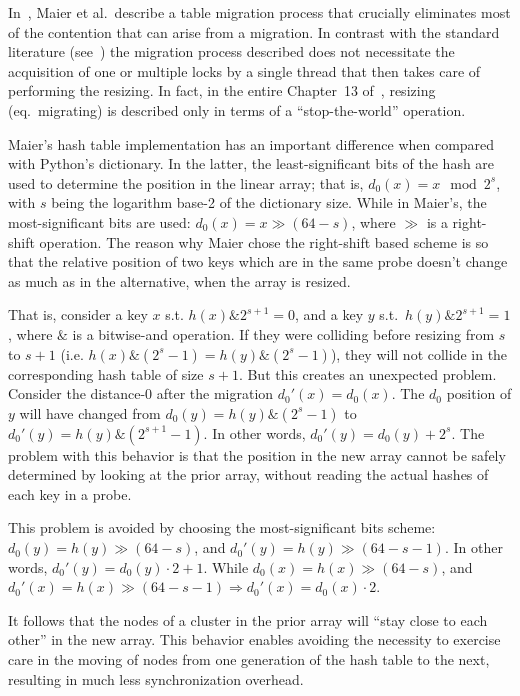 In~\cite{maier}, Maier et al.\ describe a table migration process that crucially eliminates most of the contention that can arise from a migration.
In contrast with the standard literature (see~\cite[Figure~13.30]{art-mp}) the migration process described does not necessitate the acquisition of one or multiple locks by a single thread that then takes care of performing the resizing.
In fact, in the entire Chapter~13 of~\cite{art-mp}, resizing (eq.\ migrating) is described only in terms of a ``stop-the-world'' operation.

Maier's hash table implementation has an important difference when compared with Python's dictionary.
In the latter, the least-significant bits of the hash are used to determine the position in the linear array; that is, $d_0(x) = x \mod 2^s$, with $s$ being the logarithm base-2 of the dictionary size.
While in Maier's, the most-significant bits are used: $d_0(x) = x \gg (64 - s)$, where $\gg$ is a right-shift operation.
The reason why Maier chose the right-shift based scheme is so that the relative position of two keys which are in the same probe doesn't change as much as in the alternative, when the array is resized.

That is, consider a key $x$ s.t. $h(x) \mathbin{\&} 2^{s + 1} = 0$, and a key $y$ s.t.\ $h(y) \mathbin{\&} 2^{s + 1} = 1$, where $\mathbin{\&}$ is a bitwise-and operation.
If they were colliding before resizing from $s$ to $s + 1$ (i.e. $h(x) \mathbin{\&} (2^s - 1) = h(y) \mathbin{\&} (2^s - 1)$), they will not collide in the corresponding hash table of size $s + 1$.
But this creates an unexpected problem.
Consider the distance-0 after the migration $d_0'(x) = d_0(x)$.
The $d_0$ position of $y$ will have changed from $d_0(y) = h(y) \mathbin{\&} (2^s - 1)$ to $d_0'(y) = h(y) \mathbin{\&} (2^{s+1} - 1)$.
In other words, $d_0'(y) = d_0(y) + 2^s$.
The problem with this behavior is that the position in the new array cannot be safely determined by looking at the prior array, without reading the actual hashes of each key in a probe.

This problem is avoided by choosing the most-significant bits scheme: $d_0(y) = h(y) \gg (64 - s)$, and $d_0'(y) = h(y) \gg (64 - s - 1)$.
In other words, $d_0'(y) = d_0(y) \cdot 2 + 1$.
While $d_0(x) = h(x) \gg (64 - s)$, and $d_0'(x) = h(x) \gg (64 - s - 1) \Rightarrow d_0'(x) = d_0(x) \cdot 2$.

It follows that the nodes of a cluster in the prior array will ``stay close to each other'' in the new array.
This behavior enables avoiding the necessity to exercise care in the moving of nodes from one generation of the hash table to the next, resulting in much less synchronization overhead.



